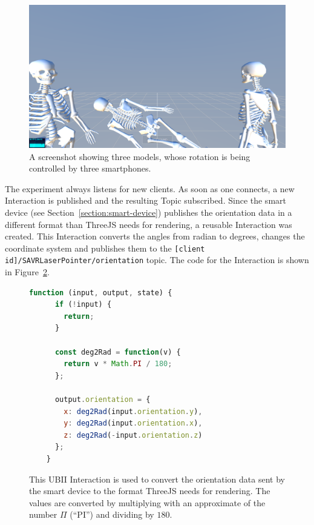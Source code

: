 \begin{figure}[H]
  \centering
  \includegraphics[width=12cm]{figures/implementation/screenshot_exp_mv.png}
  \caption[Screenshot of the model viewer experiment]{A screenshot showing three models, whose rotation is being controlled by three smartphones.}\label{fig:screenshot-exp-mv}
\end{figure}

The experiment always listens for new clients. As soon as one connects, a new Interaction is published and the resulting Topic subscribed. Since the smart device (see Section~\ref{section:smart-device}) publishes the orientation data in a different format than ThreeJS needs for rendering, a reusable Interaction was created. This Interaction converts the angles from radian to degrees, changes the coordinate system and publishes them to the \lstinline[breaklines=false]{[client id]/SAVRLaserPointer/orientation} topic. The code for the Interaction is shown in Figure~\ref{fig:ubii-interaction-angles}.

\begin{figure}[H]
  \begin{lstlisting}[language=JavaScript]
    function (input, output, state) {
      if (!input) {
        return;
      }

      const deg2Rad = function(v) {
        return v * Math.PI / 180;
      };

      output.orientation = {
        x: deg2Rad(input.orientation.y),
        y: deg2Rad(input.orientation.x),
        z: deg2Rad(-input.orientation.z)
      };
    }
  \end{lstlisting}
  \caption[Interaction of model viewer]{This \ac{UBII} Interaction is used to convert the orientation data sent by the smart device to the format ThreeJS needs for rendering. The values are converted by multiplying with an approximate of the number $\Pi$ (\enquote{PI}) and dividing by $180$.}\label{fig:ubii-interaction-angles} %
\end{figure}


